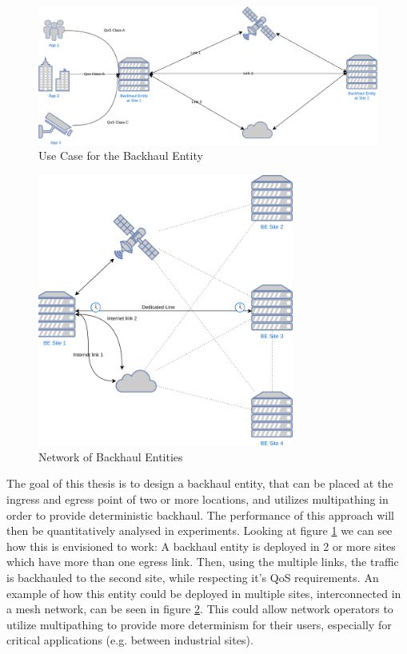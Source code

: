 \begin{figure}[h]
    \centering
        \includegraphics[width=\textwidth]{fig/use_cases.png}
        \caption{Use Case for the Backhaul Entity}
        \label{fig:use}
\end{figure}


\begin{figure}[h]
    \centering
        \includegraphics[width=0.75\textwidth, height=0.75\textwidth]{fig/mesh_network.png}
        \caption{Network of Backhaul Entities}
        \label{fig:mesh}
\end{figure}

The goal of this thesis is to design a backhaul entity, that can be placed at the ingress and egress point of two or more locations, and utilizes multipathing in order to provide deterministic backhaul. The performance of this approach will then be quantitatively analysed in experiments. Looking at figure \ref{fig:use} we can see how this is envisioned to work: A backhaul entity is deployed in 2 or more sites which have more than one egress link. Then, using the multiple links, the traffic is backhauled to the second site, while respecting it's QoS requirements. An example of how this entity could be deployed in multiple sites, interconnected in a mesh network, can be seen in figure \ref{fig:mesh}. This could allow network operators to utilize multipathing to provide more determinism for their users, especially for critical applications (e.g. between industrial sites).

